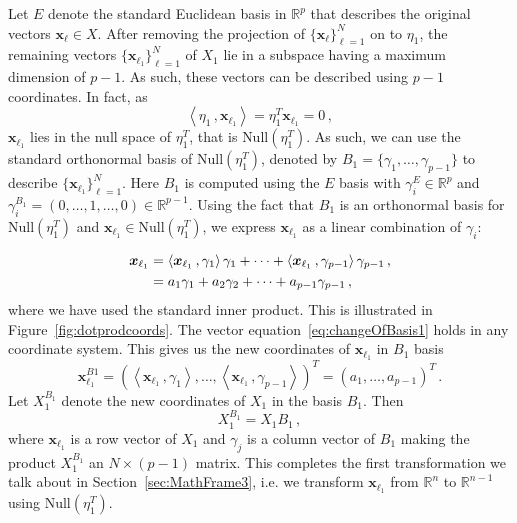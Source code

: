 \documentclass[letter,12pt]{article}
\newcommand{\Null}{\text{Null}}
\begin{document}
{Let $E$ denote the standard Euclidean basis in $\mathbb{R}^p$ that describes the original vectors $\bm{x}_\ell \in X$. After removing the projection of $\{ \bm{x}_\ell\}_{\ell =1}^N$ on to $\eta_1$,  the remaining vectors  $\{\bm{x}_{\ell_1} \}_{\ell=1}^N $ of $X_1$ lie in a  subspace having a maximum dimension of $p-1$. As such, these vectors can be described using $p-1$ coordinates. In fact, as 
$$  \left\langle \eta_1 \, ,  \bm{x}_{\ell_1} \right\rangle = \eta_1^T \bm{x}_{\ell_1} = 0 \, ,
$$ 
$\bm{x}_{\ell_1}$ lies in the null space of $\eta_1^T$, that is  $\Null(\eta_1^T)$. As such, we can use the standard orthonormal basis of $\Null(\eta_1^T)$, denoted by $B_1 = \{\gamma_1, \ldots, \gamma_{p-1} \} $ to  describe $\{\bm{x}_{\ell_1} \}_{\ell=1}^N $. Here $B_1$ is computed using the $E$ basis with $\gamma_i^E \in \mathbb{R}^p$ and  $\gamma_i^{B_1} = (0, \ldots, 1, \ldots, 0 ) \in \mathbb{R}^{p-1}$. Using the fact that $B_1$ is an orthonormal basis for $\Null(\eta_1^T)$ and  $\bm{x}_{\ell_1} \in \Null(\eta_1^T)$, we express $\bm{x}_{\ell_1}$ as a linear combination of $\gamma_i$:  

\begin{align}\label{eq:changeOfBasis1}
    \bm{x}_{\ell_1} & = \left\langle \bm{x}_{\ell_1}\, , \gamma_1 \right\rangle \gamma_1 + \cdots + \left\langle \bm{x}_{\ell_1}\, , \gamma_{p-1} \right\rangle \gamma_{p-1} \, ,  \notag \\
    & = a_1 \gamma_1 + a_2 \gamma_2 + \cdots + a_{p-1} \gamma_{p-1} \, , 
\end{align}
where we have used the standard inner product. This is illustrated in Figure~\ref{fig:dotprodcoords}. The vector equation~\eqref{eq:changeOfBasis1}  holds in any coordinate system. This gives us the new coordinates of $\bm{x}_{\ell_1}$ in $B_1$ basis
$$ \bm{x}_{\ell_1}^{B1}  = \left(\left\langle \bm{x}_{\ell_1}\, , \gamma_1 \right\rangle , \ldots, \left\langle \bm{x}_{\ell_1}\, , \gamma_{p-1} \right\rangle    \right)^T = \left(a_1, \ldots, a_{p-1} \right)^T \, .
$$
Let $X_1^{B_1}$ denote the new coordinates of $X_1$ in the basis $B_1$. Then 
$$ X_1^{B_1} = X_1 B_1 \, , 
$$
where $\bm{x}_{\ell_1}$ is a row vector of $X_1$ and $\gamma_j$ is a column vector of $B_1$ making the product $X_1^{B_1}$ an $N \times (p-1)$ matrix. This completes the first transformation we talk about in Section~\ref{sec:MathFrame3}, i.e. we transform $\bm{x}_{\ell_1}$ from $\mathbb{R}^n$ to  $\mathbb{R}^{n-1}$ using $\Null(\eta_1^T)$. 

}
\end{document}

